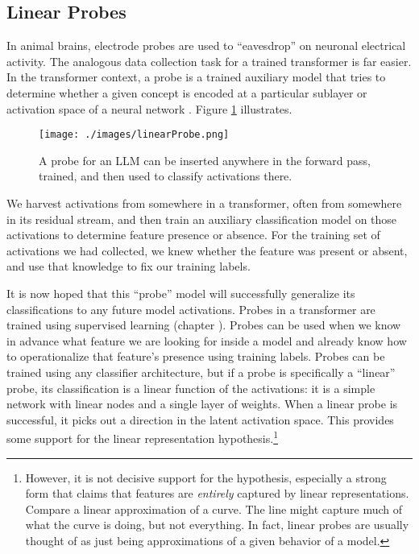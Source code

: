 \subsection{Linear Probes}

In animal brains, electrode probes are used to ``eavesdrop'' on neuronal
electrical activity. The analogous data collection task for a trained
transformer is far easier. In the transformer context, a probe is a trained
auxiliary model that tries to determine whether a given concept is encoded at a
particular sublayer or activation space of a neural network
\cite{alain2018intermediate, belinkov2021classifiers}. Figure \ref{linearProbe}
illustrates.

\begin{figure}[ht]
\centering
\texttt{[image: ./images/linearProbe.png]}
\caption[Jeff Yoshimi; the line art for the probe was generated by ChatGPT.]{ A
      probe for an LLM can be inserted anywhere in the forward pass, trained,
      and then used to classify activations there.}
\label{linearProbe}
\end{figure}

We harvest activations from somewhere in a transformer, often from somewhere in
its residual stream, and then train an auxiliary classification model on those
activations to determine feature presence or absence. For the training set of
activations we had collected, we knew whether the feature was present or
absent, and use that knowledge to fix our training labels.

It is now hoped that this ``probe'' model will successfully generalize its
classifications to any future model activations.  Probes in a transformer are
trained using supervised learning (chapter ). Probes can
be used when we know in advance what feature we are looking for inside a model
and already know how to operationalize that feature's presence using training
labels. Probes can be trained using any classifier architecture, but if a probe
is specifically a ``linear'' probe, its classification is a linear function of
the activations: it is a simple network with linear nodes and a single layer of
weights. When a linear probe is successful, it picks out a direction in the
latent activation space. This provides some support for the linear representation hypothesis.\footnote{However, it is not decisive support for the hypothesis, especially a strong form that claims that features are \emph{entirely} captured by linear representations. Compare a linear approximation of a curve. The line might capture much of what the curve is doing, but not everything. In fact, linear probes are usually thought of as just being approximations of a given behavior of a model.}

